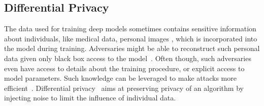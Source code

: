\subsection{Differential Privacy}

The data used for training deep models sometimes contains sensitive information
about individuals, like medical data, personal images \etc, which is
incorporated into the model during training. Adversaries might be able to
reconstruct such personal data given only black box access to the
model~\cite{fredrikson2015model}. Often though, such adversaries even have
access to details about the training procedure, or explicit access to model
parameters. %
Such knowledge can be leveraged to make attacks more
efficient~\cite{shokri2015privacy}. Differential
privacy~\cite[DP]{dwork2014algorithmic} aims at preserving privacy of an
algorithm by injecting noise to limit the influence of individual data.

